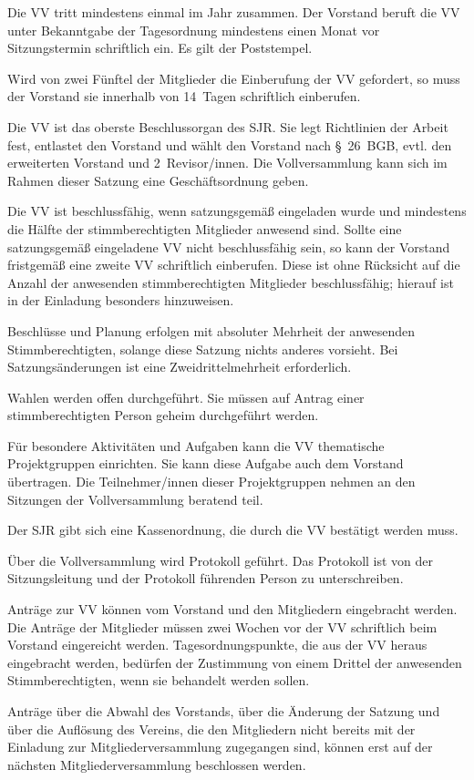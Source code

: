 \documentclass[10pt,a4paper,oneside,parskip=half]{scrartcl}
\begin{document}
\begin{contract}
Die VV tritt mindestens einmal im Jahr zusammen. Der Vorstand beruft die VV unter Bekanntgabe der Tagesordnung mindestens einen Monat vor Sitzungstermin schriftlich ein. Es gilt der Poststempel.

Wird von zwei Fünftel der Mitglieder die Einberufung der VV gefordert, so muss der Vorstand sie innerhalb von 14~Tagen schriftlich einberufen.

Die VV ist das oberste Beschlussorgan des SJR. Sie legt Richtlinien der Arbeit fest, entlastet den Vorstand und wählt den Vorstand nach §~26~BGB, evtl. den erweiterten Vorstand und 2~Revisor/innen. Die Vollversammlung kann sich im Rahmen dieser Satzung eine Geschäftsordnung geben.

Die VV ist beschlussfähig, wenn satzungsgemäß eingeladen wurde und mindestens die Hälfte der stimmberechtigten Mitglieder anwesend sind. Sollte eine satzungsgemäß eingeladene VV nicht beschlussfähig sein, so kann der Vorstand fristgemäß eine zweite VV schriftlich einberufen. Diese ist ohne Rücksicht auf die Anzahl der anwesenden stimmberechtigten Mitglieder beschlussfähig; hierauf ist in der Einladung besonders hinzuweisen.

Beschlüsse und Planung erfolgen mit absoluter Mehrheit der anwesenden Stimmberechtigten, solange diese Satzung nichts anderes vorsieht. Bei Satzungsänderungen ist eine Zweidrittelmehrheit erforderlich.

Wahlen werden offen durchgeführt. Sie müssen auf Antrag einer stimmberechtigten Person geheim durchgeführt werden.

Für besondere Aktivitäten und Aufgaben kann die VV thematische Projektgruppen einrichten. Sie kann diese Aufgabe auch dem Vorstand übertragen. Die Teilnehmer/innen dieser Projektgruppen nehmen an den Sitzungen der Vollversammlung beratend teil.

Der SJR gibt sich eine Kassenordnung, die durch die VV bestätigt werden muss.

Über die Vollversammlung wird Protokoll geführt. Das Protokoll ist von der Sitzungsleitung und der Protokoll führenden Person zu unterschreiben.

Anträge zur VV können vom Vorstand und den Mitgliedern eingebracht werden. Die Anträge der Mitglieder müssen zwei Wochen vor der VV schriftlich beim Vorstand eingereicht werden. Tagesordnungspunkte, die aus der VV heraus eingebracht werden, bedürfen der Zustimmung von einem Drittel der anwesenden Stimmberechtigten, wenn sie behandelt werden sollen.

Anträge über die Abwahl des Vorstands, über die Änderung der Satzung und über die Auflösung des Vereins, die den Mitgliedern nicht bereits mit der Einladung zur Mitgliederversammlung zugegangen sind, können erst auf der nächsten Mitgliederversammlung beschlossen werden.


\end{contract}
\end{document}
